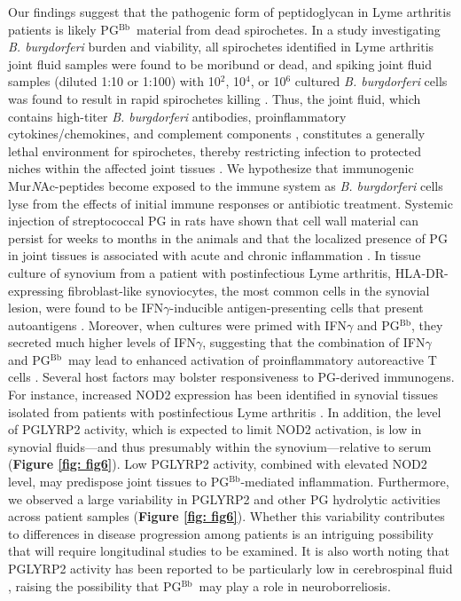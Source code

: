 \documentclass[twoside, watermark]{zHenriquesLab-StyleBioRxiv}
\newcommand{\pgbb}{PG$^\text{Bb}$}
\newcommand{\NAM}{Mur\textit{N}Ac}
\begin{document}
\vspace{1mm}
Our findings suggest that the pathogenic form of peptidoglycan in Lyme arthritis patients is likely \pgbb~material from dead spirochetes. In a study investigating \textit{B. burgdorferi} burden and viability, all spirochetes identified in Lyme arthritis joint fluid samples were found to be moribund or dead, and spiking joint fluid samples (diluted 1:10 or 1:100) with 10$^\text{2}$, 10$^\text{4}$, or 10$^\text{6}$ cultured \textit{B. burgdorferi} cells was found to result in rapid spirochetes killing \cite{Li2011}. Thus, the joint fluid, which contains high-titer \textit{B. burgdorferi} antibodies, proinflammatory cytokines/chemokines, and complement components \cite{Kannian2007,Steere1979}, constitutes a generally lethal environment for spirochetes, thereby restricting infection to protected niches within the affected joint tissues \cite{Li2011}. We hypothesize that immunogenic \NAM-peptides become exposed to the immune system as \textit{B. burgdorferi} cells lyse from the effects of initial immune responses or antibiotic treatment. Systemic injection of streptococcal PG in rats have shown that cell wall material can persist for weeks to months in the animals and that the localized presence of PG in joint tissues is associated with acute and chronic inflammation \cite{Cromartie1977,Dalldorf1980}. In tissue culture of synovium from a patient with postinfectious Lyme arthritis, HLA-DR-expressing fibroblast-like synoviocytes, the most common cells in the synovial lesion, were found to be IFN$\gamma$-inducible antigen-presenting cells that present autoantigens \cite{Rouse2024}. Moreover, when cultures were primed with IFN$\gamma$ and \pgbb, they secreted much higher levels of IFN$\gamma$, suggesting that the combination of IFN$\gamma$ and \pgbb~may lead to enhanced activation of proinflammatory autoreactive T cells \cite{Rouse2024}. Several host factors may bolster responsiveness to PG-derived immunogens. For instance, increased NOD2 expression has been identified in synovial tissues isolated from patients with postinfectious Lyme arthritis \cite{Lochhead2019}. In addition, the level of PGLYRP2 activity, which is expected to limit NOD2 activation, is low in synovial fluids—and thus presumably within the synovium—relative to serum (\textbf{Figure \ref{fig: fig6}}). Low PGLYRP2 activity, combined with elevated NOD2 level, may predispose joint tissues to \pgbb-mediated inflammation. Furthermore, we observed a large variability in PGLYRP2 and other PG hydrolytic activities across patient samples (\textbf{Figure \ref{fig: fig6}}). Whether this variability contributes to differences in disease progression among patients is an intriguing possibility that will require longitudinal studies to be examined. It is also worth noting that PGLYRP2 activity has been reported to be particularly low in cerebrospinal fluid \cite{Vanderwinkel1995}, raising the possibility that \pgbb~may play a role in neuroborreliosis.
\end{document}
